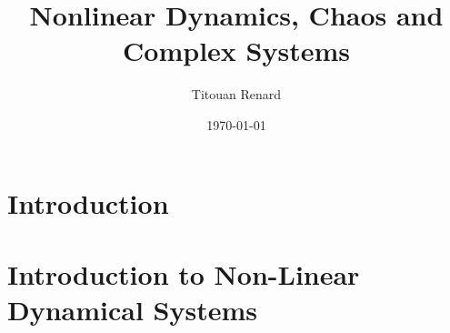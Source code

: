 \documentclass[11pt]{article}
\title{Nonlinear Dynamics, Chaos and Complex Systems}
\date{\today}
\author{Titouan Renard}
\begin{document}
\maketitle	

\section{Introduction}

\newpage

\section{Introduction to Non-Linear Dynamical Systems}

\newpage
\end{document}
